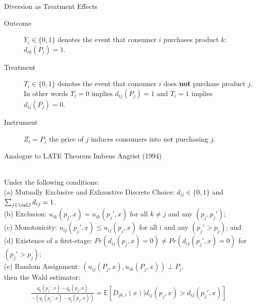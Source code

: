 \begin{frame}{Diversion as Treatment Effects}
\begin{description}
\item[Outcome] $Y_i \in \{0,1\}$ denotes the event that consumer $i$ purchases product $k$: $d_{ik}(P_j)=1$.
\item[Treatment] $T_i \in \{0,1\}$ denotes the event that consumer $i$ does \textbf{not} purchase product $j$. In other words $T_i = 0$ implies $d_{ij}(P_j)=1$ and $T_i=1$ implies $d_{ij}(P_j)=0$.
\item[Instrument] $Z_i = P_j$ the price of $j$ induces consumers into not purchasing $j$.
\end{description}
\end{frame}




\begin{frame}{Analogue to LATE Theorem Imbens Angrist (1994)}
\begin{theorem}\ \\
\label{prop:late}
Under the following conditions:\\ 
(a) Mutually Exclusive and Exhaustive Discrete Choice: $d_{ij} \in \{0,1\}$ and $\sum_{j \in \calJ} d_{ij}=1$.\\
(b) Exclusion: $u_{ik}(p_j,x)=u_{ik}(p_j',x)$ for all $k \neq j$ and any $(p_j, p_j')$; \\
(c) Monotonicity: $u_{ij}(p_j',x) \leq u_{ij}(p_j,x)$ for all $i$ and any $(p_j' > p_{j})$; and \\
(d) Existence of a first-stage: $Pr(d_{ij}(p_j,x)=0) \neq Pr(d_{ij}(p_j',x)=0) $ for $(p_j' > p_{j})$; \\
(e) Random Assignment: $(u_{ij}(P_j,x),u_{ik}(P_j,x)) \perp P_j$. \\
\noindent
then the Wald estimator:
\begin{align*}
 \frac{q_k(p_j',x) - q_k(p_j,x)}{-\left(q_j(p_j',x) - q_j(p_j,x)\right)}=\mathbb{E}[D_{jk,i}(x) | d_{ij}(p_j,x) > d_{ij}(p_j',x)]
\end{align*}
\end{theorem}
\end{frame}

